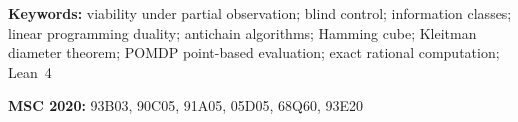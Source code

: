 \documentclass[11pt,a4paper]{article}
\theoremstyle{plain}
\theoremstyle{definition}
\theoremstyle{remark}
\begin{document}
\begin{abstract}
survival until the horizon exceeds $L$. The $143{,}360$ boundary sets at $m=6$ explain why exact arithmetic is necessary: a floating-point simulation of their optimal words declares a false collapse in $1{,}120$ of the $1{,}280$ maximal cases, depending only on how the same rational drift is coded. Every number is regenerated by an exact script; the dynamics, pair laws, the $m=4$ classification and the deadline law are machine-checked in Lean~4 ($80$ theorems, no \texttt{sorry}).
\end{abstract}

\medskip
\noindent\textbf{Keywords:} viability under partial observation; blind control; information classes; linear programming duality; antichain algorithms; Hamming cube; Kleitman diameter theorem; POMDP point-based evaluation; exact rational computation; Lean~4

\medskip
\noindent\textbf{MSC 2020:} 93B03, 90C05, 91A05, 05D05, 68Q60, 93E20
\end{document}
